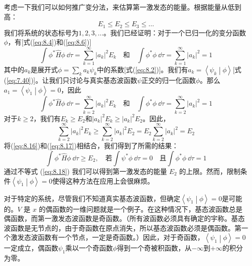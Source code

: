     考虑一下我们可以如何推广变分法，来估算第一激发态的能量。根据能量从低到高：
    \begin{equation*}
        E_1 \leq E_2 \leq E_3 \leq \ldots
    \end{equation*}
    我们将系统的状态标号为$1,2,3,\ldots$。我们已经证明：对于一个已归一化的变分函数$\phi$，有[式(\ref{eq:8.4})和(\ref{eq:8.6})]
    \begin{equation*}
        \int \phi^{\ast} \hat{H}\phi \:\dd \tau = \sum_{k=1}^{\infty} |a_k|^2 E_k \quad \text{和} \quad \int \phi^{\ast} \phi \:\dd \tau = \sum_{k=1}^{\infty} |a_k|^2 = 1
    \end{equation*}
    其中的$a_k$是展开式$\phi = \sum_{k} a_k \psi_k$中的系数[式(\ref{eq:8.2})]。我们有$a_k = \left\langle \psi_k \middle| \phi \right\rangle$[式(\ref{eq:7.40})]。让我们只讨论与真实基态波函数$\psi$正交的归一化函数$\phi$。那么$a_1 = \left\langle \psi_1 \middle| \phi \right\rangle = 0$，因此
    \begin{equation}
        \int \phi^{\ast} \hat{H}\phi \:\dd \tau = \sum_{k=2}^{\infty} |a_k|^2 E_k \quad \text{和} \quad \int \phi^{\ast} \phi \:\dd \tau = \sum_{k=2}^{\infty} |a_k|^2 = 1
        \label{eq:8.16}
    \end{equation}
    对于$k \geq 2$，我们有$E_k \geq E_2$和$\left|a_k\right|^2E_k \geq \left|a_k\right|^2E_2$。因此，
    \begin{equation}
        \sum_{k=2}^{\infty} \left|a_k\right|^2 E_k \geq \sum_{k=2}^{\infty} \left|a_k\right|^2 E_2 = E_2 \sum_{k=2}^{\infty} \left|a_k\right|^2 = E_2
        \label{eq:8.17}
    \end{equation}
    将(\ref{eq:8.16})和(\ref{eq:8.17})相结合，我们得到了所需的结果：
    \begin{equation}
        \int \phi^{\ast} \hat{H}\phi \:\dd \tau \geq E_2, \quad \text{若} \int \psi^{\ast} \phi \:\dd \tau = 0 \quad \text{且} \int \phi^{\ast} \phi \:\dd \tau = 1
        \label{eq:8.18}
    \end{equation}
    通过不等式 (\ref{eq:8.18}) 我们可以得到第一激发态的能量 $E_2$ 的上限。然而，限制条件$\left\langle \psi_1 \middle| \phi \right\rangle = 0$使得这种方法在应用上会很麻烦。

    对于特定的系统，尽管我们不知道真实基态波函数，但确定$\left\langle \psi_1 \middle| \phi \right\rangle = 0$是可能的。$V$ 是 $x$ 的偶函数的一维问题就是一个例子。在这种情况下，基态波函数总是偶函数，而第一激发态波函数是奇函数。（所有波函数必须具有确定的宇称。基态波函数是无节点的，由于奇函数在原点消失，所以基态波函数必须是偶函数。第一个激发态波函数有一个节点，一定是奇函数。）因此，对于奇函数，$\left\langle \psi_1 \middle| \phi \right\rangle = 0$一定成立，偶函数$\psi_1$乘以一个奇函数$\phi$得到一个奇被积函数，从$-\infty$到$+\infty$的积分为零。

